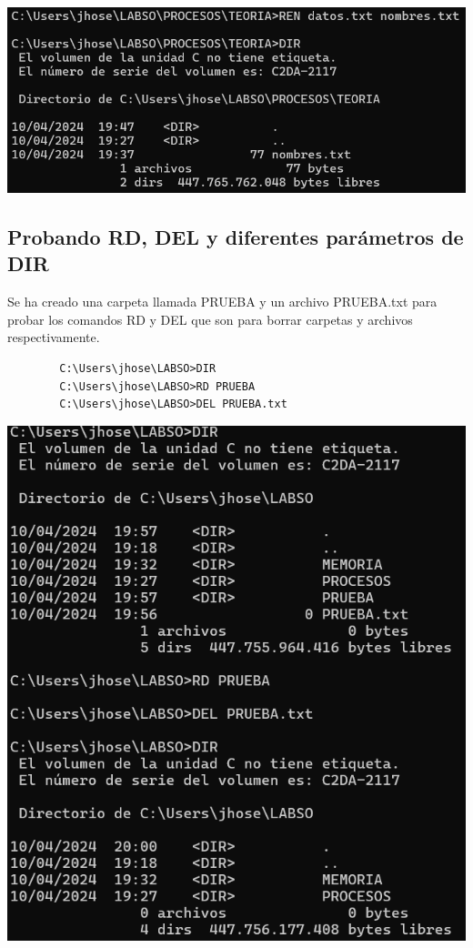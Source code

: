 \documentclass{article}
\begin{document}
        \includegraphics[scale=0.8]{WindowsCapturas/RenombrarTXT.png}  

    \subsection{Probando RD, DEL y diferentes parámetros de DIR}
        Se ha creado una carpeta llamada PRUEBA y un archivo PRUEBA.txt para probar los comandos RD y DEL que son para borrar carpetas y archivos respectivamente.
        \begin{verbatim}
        C:\Users\jhose\LABSO>DIR
        C:\Users\jhose\LABSO>RD PRUEBA
        C:\Users\jhose\LABSO>DEL PRUEBA.txt
        \end{verbatim}
        
        \includegraphics[scale=0.6]{WindowsCapturas/DELyRD.png}  
\end{document}

